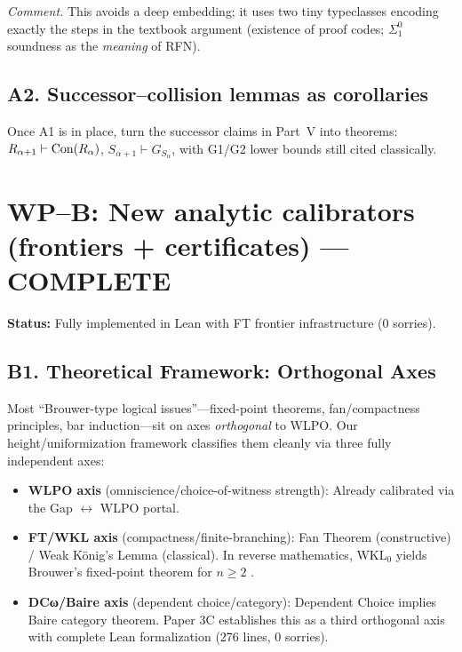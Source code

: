 \documentclass[11pt]{article}
\theoremstyle{definition}
\theoremstyle{remark}
\begin{document}
\emph{Comment.} This avoids a deep embedding; it uses two tiny typeclasses encoding exactly the steps in the textbook argument (existence of proof codes; $\Sigma^0_1$ soundness as the \emph{meaning} of RFN).

\subsection{A2. Successor–collision lemmas as corollaries}
Once A1 is in place, turn the successor claims in Part~V into theorems: 
\(
R_{\alpha+1}\vdash \mathrm{Con}(R_\alpha)\), 
\(S_{\alpha+1}\vdash G_{S_\alpha}\),
with G1/G2 lower bounds still cited classically.

\section{WP–B: New analytic calibrators (frontiers + certificates) — \textbf{\color{green}COMPLETE}}

\textbf{Status:} Fully implemented in Lean with FT frontier infrastructure (0 sorries).

\subsection{B1. Theoretical Framework: Orthogonal Axes}

Most ``Brouwer-type logical issues''—fixed-point theorems, fan/compactness principles, bar induction—sit on axes \emph{orthogonal} to WLPO. Our height/uniformization framework classifies them cleanly via three fully independent axes:

\begin{itemize}
\item \textbf{WLPO axis} (omniscience/choice-of-witness strength): Already calibrated via the Gap $\leftrightarrow$ WLPO portal.
\item \textbf{FT/WKL axis} (compactness/finite-branching): Fan Theorem (constructive) / Weak König's Lemma (classical). In reverse mathematics, WKL$_0$ yields Brouwer's fixed-point theorem for $n \geq 2$ \cite{Hirst-BFPT}.
\item \textbf{DCω/Baire axis} (dependent choice/category): Dependent Choice implies Baire category theorem. Paper 3C establishes this as a third orthogonal axis with complete Lean formalization (276 lines, 0 sorries).
\end{itemize}
\end{document}
